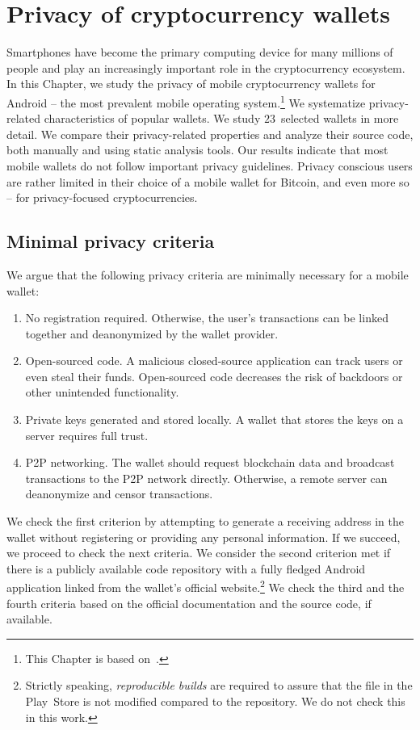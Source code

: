 \chapter{Privacy of cryptocurrency wallets}

\label{Chapter04Wallets}


Smartphones have become the primary computing device for many millions of people and play an increasingly important role in the cryptocurrency ecosystem.
In this Chapter, we study the privacy of mobile cryptocurrency wallets for Android -- the most prevalent mobile operating system.\footnote{This Chapter is based on~\cite{Biryukov2019}.}
We systematize privacy-related characteristics of popular wallets.
We study $23$~selected wallets in more detail.
We compare their privacy-related properties and analyze their source code, both manually and using static analysis tools.
Our results indicate that most mobile wallets do not follow important privacy guidelines.
Privacy conscious users are rather limited in their choice of a mobile wallet for Bitcoin, and even more so -- for privacy-focused cryptocurrencies.


\section{Minimal privacy criteria} \label{section:Ch04Initialprivacycriteria}

We argue that the following privacy criteria are minimally necessary for a mobile wallet:
\begin{enumerate}
	\item No registration required. Otherwise, the user's transactions can be linked together and deanonymized by the wallet provider. 
	\item Open-sourced code. A malicious closed-source application can track users or even steal their funds. Open-sourced code decreases the risk of backdoors or other unintended functionality. 
	\item Private keys generated and stored locally. A wallet that stores the keys on a server requires full trust.
	\item P2P networking. The wallet should request blockchain data and broadcast transactions to the P2P network directly. Otherwise, a remote server can deanonymize and censor transactions.
\end{enumerate}
We check the first criterion by attempting to generate a receiving address in the wallet without registering or providing any personal information.
If we succeed, we proceed to check the next criteria.
We consider the second criterion met if there is a publicly available code repository with a fully fledged Android application linked from the wallet's official website.\footnote{Strictly speaking, \textit{reproducible builds} are required to assure that the file in the Play~Store is not modified compared to the repository. We do not check this in this work.}
We check the third and the fourth criteria based on the official documentation and the source code, if available.

